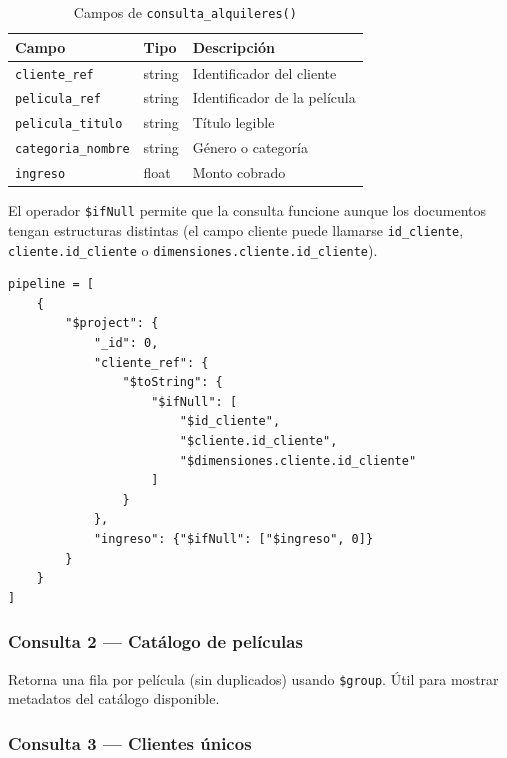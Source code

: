 \documentclass[12pt,a4paper]{article}
\begin{document}
\begin{table}[H]
  \centering
  \caption{Campos de \texttt{consulta\_alquileres()}}
  \begin{tabular}{lll}
    \toprule
    \textbf{Campo}            & \textbf{Tipo}  & \textbf{Descripci\'on} \\
    \midrule
    \texttt{cliente\_ref}      & string  & Identificador del cliente \\
    \texttt{pelicula\_ref}     & string  & Identificador de la pel\'icula \\
    \texttt{pelicula\_titulo}  & string  & T\'itulo legible \\
    \texttt{categoria\_nombre} & string  & G\'enero o categor\'ia \\
    \texttt{ingreso}           & float   & Monto cobrado \\
    \bottomrule
  \end{tabular}
\end{table}

El operador \texttt{\$ifNull} permite que la consulta funcione aunque los
documentos tengan estructuras distintas (el campo cliente puede llamarse
\texttt{id\_cliente}, \texttt{cliente.id\_cliente} o
\texttt{dimensiones.cliente.id\_cliente}).

\begin{lstlisting}[caption={Fragmento del pipeline de alquileres}]
pipeline = [
    {
        "$project": {
            "_id": 0,
            "cliente_ref": {
                "$toString": {
                    "$ifNull": [
                        "$id_cliente",
                        "$cliente.id_cliente",
                        "$dimensiones.cliente.id_cliente"
                    ]
                }
            },
            "ingreso": {"$ifNull": ["$ingreso", 0]}
        }
    }
]
\end{lstlisting}

\subsubsection{Consulta 2 --- Cat\'alogo de pel\'iculas}

Retorna una fila por pel\'icula (sin duplicados) usando \texttt{\$group}.
\'Util para mostrar metadatos del cat\'alogo disponible.

\subsubsection{Consulta 3 --- Clientes \'unicos}
\end{document}
